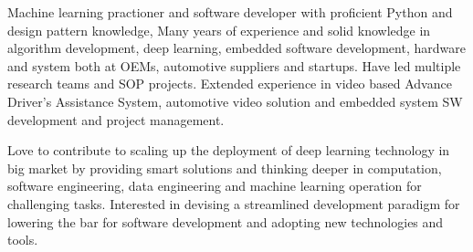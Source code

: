 \documentclass[../resume.tex]{subfiles}
\begin{document}


\begin{cvparagraph}

Machine learning practioner and software developer with proficient Python and design pattern knowledge, Many years of experience and solid knowledge in algorithm development, deep learning, embedded software development, hardware and system both at OEMs, automotive suppliers and startups. Have led multiple research teams and SOP projects. Extended experience in video based Advance Driver’s Assistance System, automotive video solution and embedded system SW development and project management.

Love to contribute to scaling up the deployment of deep learning technology in big market by providing smart solutions and thinking deeper in computation, software engineering, data engineering and machine learning operation for challenging tasks. Interested in devising a streamlined development paradigm for lowering the bar for software development and adopting new technologies and tools.


\end{cvparagraph}
\end{document}
